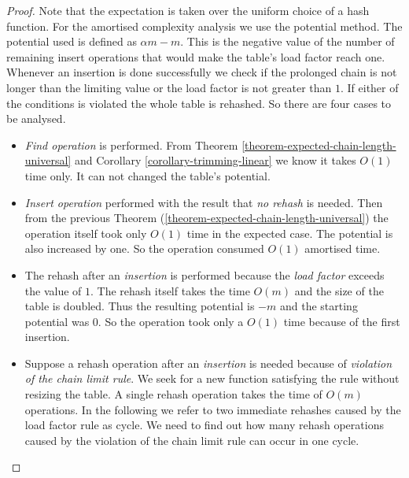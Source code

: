 \begin{proof}
Note that the expectation is taken over the uniform choice of a hash function. For the amortised complexity analysis we use the potential method. The potential used is defined as $\alpha m - m$. This is the negative value of the number of remaining insert operations that would make the table's load factor reach one. Whenever an insertion is done successfully we check if the prolonged chain is not longer than the limiting value or the load factor is not greater than $1$. If either of the conditions is violated the whole table is rehashed. So there are four cases to be analysed.
\begin{itemize}
\item \emph{Find operation} is performed. From Theorem \ref{theorem-expected-chain-length-universal} and Corollary \ref{corollary-trimming-linear} we know it takes $O(1)$ time only. It can not changed the table's potential.

\item \emph{Insert operation} performed with the result that \emph{no rehash} is needed. Then from the previous Theorem (\ref{theorem-expected-chain-length-universal}) the operation itself took only $O(1)$ time in the expected case. The potential is also increased by one. So the operation consumed $O(1)$ amortised time.

\item The rehash after an \emph{insertion} is performed because the \emph{load factor} exceeds the value of $1$. The rehash itself takes the time $O(m)$ and the size of the table is doubled. Thus the resulting potential is $-m$ and the starting potential was $0$. So the operation took only a $O(1)$ time because of the first insertion.

\item Suppose a rehash operation after an \emph{insertion} is needed because of \emph{violation of the chain limit rule}. We seek for a new function satisfying the rule without resizing the table. A single rehash operation takes the time of $O(m)$ operations. In the following we refer to two immediate rehashes caused by the load factor rule as cycle. We need to find out how many rehash operations caused by the violation of the chain limit rule can occur in one cycle. 


\end{itemize}
\end{proof}
